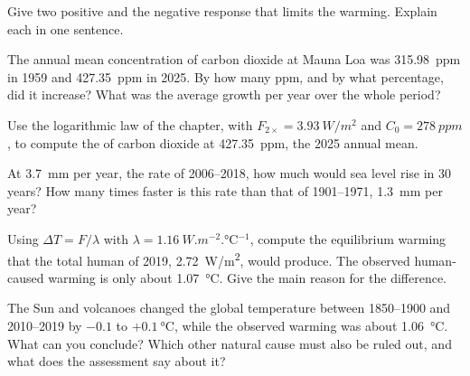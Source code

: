 \begin{exercise}[$\star$]\label{exo:g12:climate-change:5}
Give two positive  and the negative response that limits
the warming. Explain each in one sentence.
\end{exercise}

\begin{exercise}[$\star\star$]\label{exo:g12:climate-change:6}
The annual mean concentration of carbon dioxide at Mauna Loa was
\qty{315.98}{ppm} in 1959 and \qty{427.35}{ppm} in 2025. By how many ppm,
and by what percentage, did it increase? What was the average growth per
year over the whole period?
\end{exercise}

\begin{exercise}[$\star\star$]\label{exo:g12:climate-change:7}
Use the logarithmic law of the chapter, with $F_{2\times} =
\qty{3.93}{W/m^2}$ and $C_0 = \qty{278}{ppm}$, to compute the  of
carbon dioxide at \qty{427.35}{ppm}, the 2025 annual mean.
\end{exercise}

\begin{exercise}[$\star\star$]\label{exo:g12:climate-change:8}
At \qty{3.7}{mm} per year, the rate of 2006--2018, how much would sea level
rise in 30 years? How many times faster is this rate than that of
1901--1971, \qty{1.3}{mm} per year?
\end{exercise}

\begin{exercise}[$\star\star$]\label{exo:g12:climate-change:9}
Using $\Delta T = F/\lambda$ with $\lambda = \qty{1.16}{W.m^{-2}.\degreeCelsius^{-1}}$,
compute the equilibrium warming that the total human  of 2019,
\qty{2.72}{W/m^2}, would produce. The observed human-caused warming is only
about \qty{1.07}{\degreeCelsius}. Give the main reason for the difference.
\end{exercise}

\begin{exercise}[$\star\star$]\label{exo:g12:climate-change:10}
The Sun and volcanoes changed the global temperature between 1850--1900 and
2010--2019 by $-0.1$ to $+\qty{0.1}{\degreeCelsius}$, while the observed
warming was about \qty{1.06}{\degreeCelsius}. What can you conclude? Which
other natural cause must also be ruled out, and what does the assessment
say about it?
\end{exercise}

